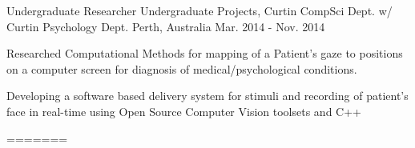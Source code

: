 \begin{cventries}

\cventry
    {Undergraduate Researcher} %
    {Undergraduate Projects, Curtin CompSci Dept. w/ Curtin Psychology Dept.} %
    {Perth, Australia} %
    {Mar. 2014 - Nov. 2014} %
    {
      \begin{cvitems} %
        \item {Researched Computational Methods for mapping of a Patient’s gaze to positions on a computer screen for diagnosis of medical/psychological conditions.}
        \item {Developing a software based delivery system for stimuli and recording of patient’s face in real-time using Open Source Computer Vision toolsets and C++}
      \end{cvitems}
    }

\end{cventries}
=======


